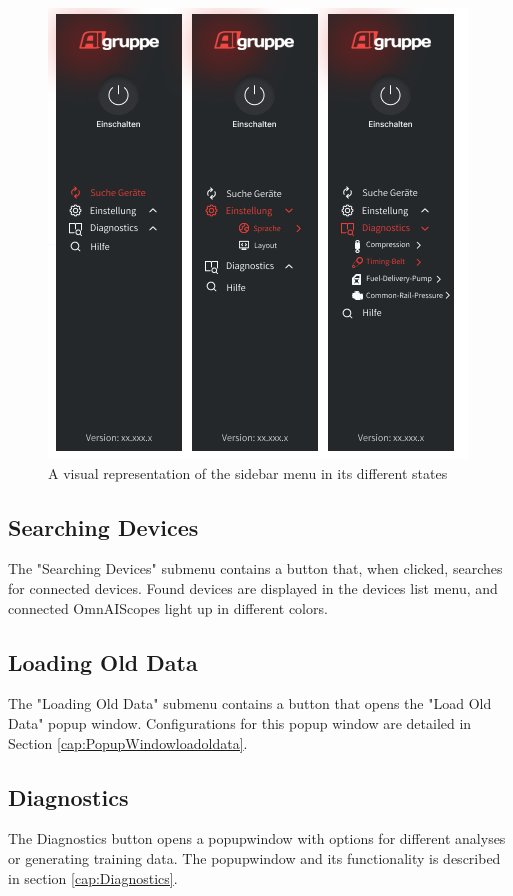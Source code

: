 \documentclass[]{scrreprt}
\begin{document}
\begin{figure}
\includegraphics[width=.9\textwidth]{assets/pictures/SideBarMenu.png}
\caption[]{A visual representation of the sidebar menu in its different states}
\label{fig:sidebarMenu}
\end{figure}


\subsection{Searching Devices}
The "Searching Devices" submenu contains a button that, when clicked, searches for connected devices. Found devices are displayed in the devices list menu, and connected OmnAIScopes light up in
different colors.


\subsection{Loading Old Data}
The "Loading Old Data" submenu contains a button that opens the "Load Old Data" popup window. Configurations for this popup window are detailed in Section \ref{cap:PopupWindowloadoldata}.


\subsection{Diagnostics}
The Diagnostics button opens a popupwindow with options for different analyses or generating training data. The popupwindow and its functionality is described in section \ref{cap:Diagnostics}.
\end{document}
